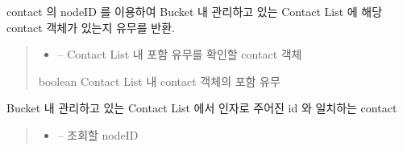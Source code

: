 \documentclass[a4paper,10pt,english]{sphinxmanual}
\begin{document}
\begin{fulllineitems}
\begin{fulllineitems}
\end{fulllineitems}


\begin{fulllineitems}
\label{\detokenize{_kademlia:Bucket.contains}}
\pysigstartsignatures
{}
\pysigstopsignatures
\sphinxAtStartPar
contact 의 nodeID 를 이용하여 Bucket 내 관리하고 있는 Contact List 에 해당 contact 객체가 있는지 유무를 반환.
\begin{quote}\begin{description}
\begin{itemize}
\item {} 
\sphinxAtStartPar
{} – Contact List 내 포함 유무를 확인할 contact 객체

\end{itemize}

\sphinxAtStartPar
boolean \sphinxhyphen{} Contact List 내 contact 객체의 포함 유무

\end{description}\end{quote}

\end{fulllineitems}


\begin{fulllineitems}
\label{\detokenize{_kademlia:Bucket.findContact}}
\pysigstartsignatures
{}
\pysigstopsignatures
\sphinxAtStartPar
Bucket 내 관리하고 있는 Contact List 에서 인자로 주어진 id 와 일치하는 contact
\begin{quote}\begin{description}
\begin{itemize}
\item {} 
\sphinxAtStartPar
{} – 조회할 nodeID

\end{itemize}


\end{description}
\end{quote}
\end{fulllineitems}
\end{fulllineitems}
\end{document}
